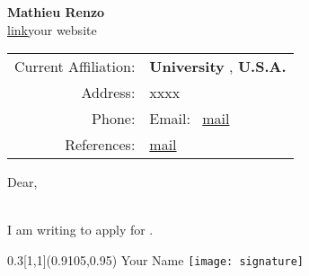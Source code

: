 \documentclass[11pt,letter]{article}
\begin{document}
\begin{center}
{\LARGE \bf Mathieu Renzo}\\
\vspace{0.1cm}
{
  \footnotesize
 \url{link}{your website} \\
}
\begin{tabular}[ht]{rl}
  Current Affiliation: & {\bf University }, {\bf U.S.A.}  \\
  Address: & xxxx\\
  Phone: &    \qquad \qquad Email: \
           \href{mailto:}{mail}\\
References: & \href{mailto:}{mail}

\end{tabular}
\end{center}
\hrulefill

\vspace{0.1cm}

Dear,\\\

I am writing to apply for .






   \begin{textblock}{0.3}[1,1](0.9105,0.95)
     \centering
     Your Name
     \texttt{[image: signature]}
   \end{textblock}



\end{document}
